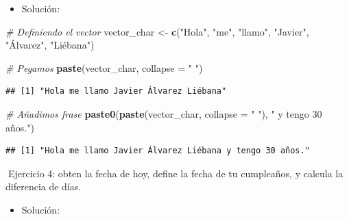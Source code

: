 \documentclass[11pt,]{book}
\newenvironment{Shaded}{\begin{snugshade}}{\end{snugshade}}
\newcommand{\CommentTok}[1]{\textcolor[rgb]{0.37,0.37,0.37}{\textit{#1}}}
\newcommand{\DataTypeTok}[1]{\textcolor[rgb]{0.27,0.27,0.27}{#1}}
\newcommand{\KeywordTok}[1]{\textcolor[rgb]{0.27,0.27,0.27}{\textbf{#1}}}
\newcommand{\NormalTok}[1]{#1}
\newcommand{\OperatorTok}[1]{\textcolor[rgb]{0.43,0.43,0.43}{\textbf{#1}}}
\newcommand{\StringTok}[1]{\textcolor[rgb]{0.5,0.5,0.5}{#1}}
\providecommand{\tightlist}{%
  \setlength{\itemsep}{0pt}\setlength{\parskip}{0pt}}
\begin{document}
\begin{itemize}
\tightlist
\item
  Solución:
\end{itemize}

\begin{Shaded}
\begin{Highlighting}[]
\CommentTok{# Definiendo el vector}
\NormalTok{vector_char <-}\StringTok{ }\KeywordTok{c}\NormalTok{(}\StringTok{"Hola"}\NormalTok{, }\StringTok{"me"}\NormalTok{, }\StringTok{"llamo"}\NormalTok{, }\StringTok{"Javier"}\NormalTok{,}
                 \StringTok{"Álvarez"}\NormalTok{, }\StringTok{"Liébana"}\NormalTok{)}

\CommentTok{# Pegamos}
\KeywordTok{paste}\NormalTok{(vector_char, }\DataTypeTok{collapse =} \StringTok{" "}\NormalTok{)}
\end{Highlighting}
\end{Shaded}

\begin{verbatim}
## [1] "Hola me llamo Javier Álvarez Liébana"
\end{verbatim}

\begin{Shaded}
\begin{Highlighting}[]
\CommentTok{# Añadimos frase}
\KeywordTok{paste0}\NormalTok{(}\KeywordTok{paste}\NormalTok{(vector_char, }\DataTypeTok{collapse =} \StringTok{" "}\NormalTok{), }\StringTok{" y tengo 30 años."}\NormalTok{)}
\end{Highlighting}
\end{Shaded}

\begin{verbatim}
## [1] "Hola me llamo Javier Álvarez Liébana y tengo 30 años."
\end{verbatim}

📝Ejercicio 4: obten la fecha de hoy, define la fecha de tu cumpleaños, y calcula la diferencia de días.

\begin{itemize}
\tightlist
\item
  Solución:
\end{itemize}

\begin{Shaded}
\end{Shaded}
\end{document}
